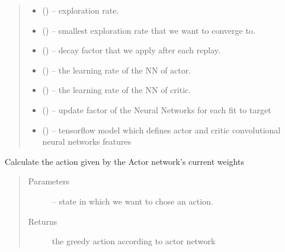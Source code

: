 \documentclass[letterpaper,10pt,english]{sphinxmanual}
\begin{document}
\begin{fulllineitems}
\begin{quote}
\begin{description}
\begin{itemize}
\item {} 
 () -- exploration rate.

\item {} 
 () -- smallest exploration rate that we want to converge to.

\item {} 
 () -- decay factor that we apply after each replay.

\item {} 
 () -- the learning rate of the NN of actor.

\item {} 
 () -- the learning rate of the NN of critic.

\item {} 
{\hyperref[\detokenize{package2:DDPG.DDPGAgent.update_target}]{}} () -- update factor of the Neural Networks for each fit to target

\item {} 
 () -- tensorflow model which defines actor and critic convolutional neural networks features

\end{itemize}

\end{description}\end{quote}

\begin{fulllineitems}
\label{\detokenize{package2:DDPG.DDPGAgent.act}}
Calculate the action given by the Actor network's current weights
\begin{quote}\begin{description}
\item[{Parameters}] \leavevmode
{} -- state in which we want to chose an action.

\item[{Returns}] \leavevmode
the greedy action according to actor network


\end{description}
\end{quote}
\end{fulllineitems}
\end{fulllineitems}
\end{document}
